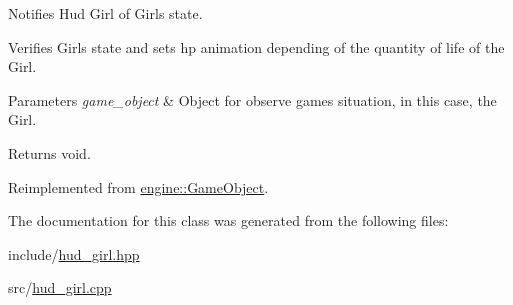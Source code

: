 Notifies Hud Girl of Girl\textquotesingle{}s state. 

Verifies Girl\textquotesingle{}s state and sets hp\textquotesingle{} animation depending of the quantity of life of the Girl.


\begin{DoxyParams}{Parameters}
{\em game\+\_\+object} & Object for observe game\textquotesingle{}s situation, in this case, the Girl. \\
\hline
\end{DoxyParams}
\begin{DoxyReturn}{Returns}
void. 
\end{DoxyReturn}


Reimplemented from \hyperlink{classengine_1_1_game_object}{engine\+::\+Game\+Object}.



The documentation for this class was generated from the following files\+:\begin{DoxyCompactItemize}
\item 
include/\hyperlink{hud__girl_8hpp}{hud\+\_\+girl.\+hpp}\item 
src/\hyperlink{hud__girl_8cpp}{hud\+\_\+girl.\+cpp}\end{DoxyCompactItemize}
